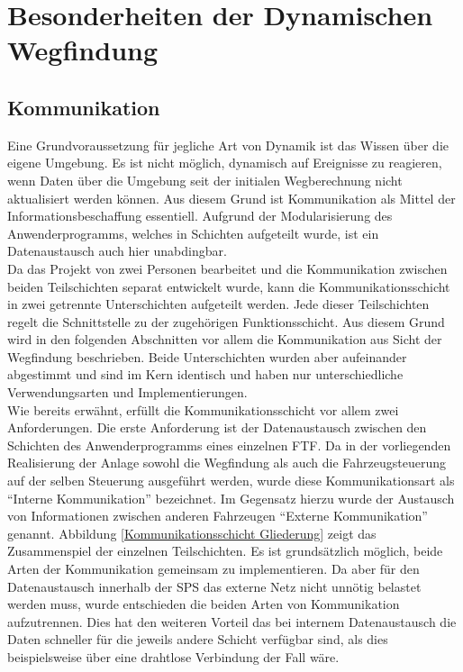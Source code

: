 \chapter{Besonderheiten der Dynamischen Wegfindung}

\section{Kommunikation}
	\label{Kommunikation}
	Eine Grundvoraussetzung für jegliche Art von Dynamik ist das Wissen über die eigene Umgebung. Es ist nicht möglich, dynamisch auf Ereignisse zu reagieren, wenn Daten über die Umgebung seit der initialen Wegberechnung nicht aktualisiert werden können. Aus diesem Grund ist Kommunikation als Mittel der Informationsbeschaffung essentiell. Aufgrund der Modularisierung des Anwenderprogramms, welches in Schichten aufgeteilt wurde, ist ein Datenaustausch auch hier unabdingbar. 
	\\[4pt]
	Da das Projekt von zwei Personen bearbeitet und die Kommunikation zwischen beiden Teilschichten separat entwickelt wurde, kann die Kommunikationsschicht in zwei getrennte Unterschichten aufgeteilt werden. Jede dieser Teilschichten regelt die Schnittstelle zu der zugehörigen Funktionsschicht. Aus diesem Grund wird in den folgenden Abschnitten vor allem die Kommunikation aus Sicht der Wegfindung beschrieben. Beide Unterschichten wurden aber aufeinander abgestimmt und sind im Kern identisch und haben nur unterschiedliche Verwendungsarten und Implementierungen.
	\\[4pt]
	Wie bereits erwähnt, erfüllt die Kommunikationsschicht vor allem zwei Anforderungen. Die erste Anforderung ist der Datenaustausch zwischen den Schichten des Anwenderprogramms eines einzelnen \ac{FTF}. Da in der vorliegenden Realisierung der Anlage sowohl die Wegfindung als auch die Fahrzeugsteuerung auf der selben Steuerung ausgeführt werden, wurde diese Kommunikationsart als "`Interne Kommunikation"' bezeichnet. Im Gegensatz hierzu wurde der Austausch von Informationen zwischen anderen Fahrzeugen "`Externe Kommunikation"' genannt. Abbildung \ref{Kommunikationsschicht Gliederung} zeigt das Zusammenspiel der einzelnen Teilschichten. Es ist grundsätzlich möglich, beide Arten der Kommunikation gemeinsam zu implementieren. Da aber für den Datenaustausch innerhalb der \ac{SPS} das externe Netz nicht unnötig belastet werden muss, wurde entschieden die beiden Arten von Kommunikation aufzutrennen. Dies hat den weiteren Vorteil das bei internem Datenaustausch die Daten schneller für die jeweils andere Schicht verfügbar sind, als dies beispielsweise über eine drahtlose Verbindung der Fall wäre.
	
